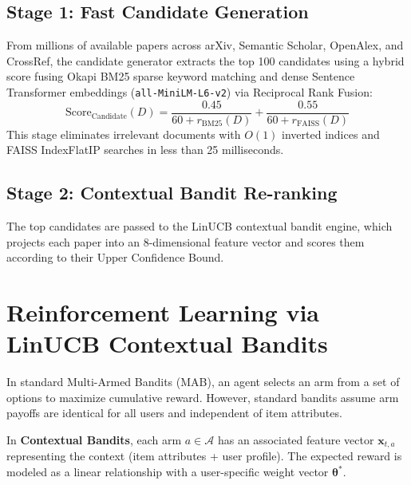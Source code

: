 \documentclass[11pt,a4paper]{article}
\begin{document}
\subsection{Stage 1: Fast Candidate Generation}
From millions of available papers across arXiv, Semantic Scholar, OpenAlex, and CrossRef, the candidate generator extracts the top 100 candidates using a hybrid score fusing Okapi BM25 sparse keyword matching and dense Sentence Transformer embeddings (\texttt{all-MiniLM-L6-v2}) via Reciprocal Rank Fusion:
\begin{equation}
\text{Score}_{\text{Candidate}}(D) = \frac{0.45}{60 + r_{\text{BM25}}(D)} + \frac{0.55}{60 + r_{\text{FAISS}}(D)}
\end{equation}
This stage eliminates irrelevant documents with $O(1)$ inverted indices and FAISS IndexFlatIP searches in less than 25 milliseconds.

\subsection{Stage 2: Contextual Bandit Re-ranking}
The top candidates are passed to the LinUCB contextual bandit engine, which projects each paper into an 8-dimensional feature vector and scores them according to their Upper Confidence Bound.

\section{Reinforcement Learning via LinUCB Contextual Bandits}

In standard Multi-Armed Bandits (MAB), an agent selects an arm from a set of options to maximize cumulative reward. However, standard bandits assume arm payoffs are identical for all users and independent of item attributes. 

In \textbf{Contextual Bandits}, each arm $a \in \mathcal{A}$ has an associated feature vector $\mathbf{x}_{t, a}$ representing the context (item attributes + user profile). The expected reward is modeled as a linear relationship with a user-specific weight vector $\boldsymbol{\theta}^*$.
\end{document}
